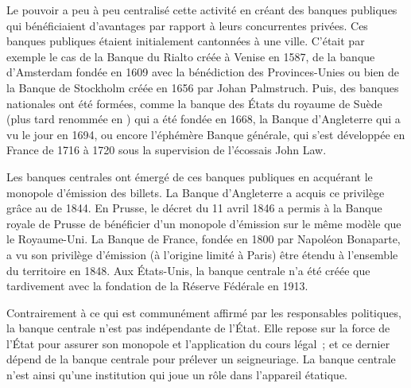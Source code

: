 Le pouvoir a peu à peu centralisé cette activité en créant des banques publiques qui bénéficiaient d'avantages par rapport à leurs concurrentes privées. Ces banques publiques étaient initialement cantonnées à une ville. C'était par exemple le cas de la Banque du Rialto créée à Venise en 1587, de la banque d'Amsterdam fondée en 1609 avec la bénédiction des Provinces-Unies ou bien de la Banque de Stockholm créée en 1656 par Johan Palmstruch. Puis, des banques nationales ont été formées, comme la banque des États du royaume de Suède (plus tard renommée en ) qui a été fondée en 1668, la Banque d'Angleterre qui a vu le jour en 1694, ou encore l'éphémère Banque générale, qui s'est développée en France de 1716 à 1720 sous la supervision de l'écossais John Law. %

Les banques centrales ont émergé de ces banques publiques en acquérant le monopole d'émission des billets. La Banque d'Angleterre a acquis ce privilège grâce au  de 1844. En Prusse, le décret du 11 avril 1846 a permis à la Banque royale de Prusse de bénéficier d'un monopole d'émission sur le même modèle que le Royaume-Uni. La Banque de France, fondée en 1800 par Napoléon Bonaparte, a vu son privilège d'émission (à l'origine limité à Paris) être étendu à l'ensemble du territoire en 1848. Aux États-Unis, la banque centrale n'a été créée que tardivement avec la fondation de la Réserve Fédérale en 1913.

Contrairement à ce qui est communément affirmé par les responsables politiques, la banque centrale n'est pas indépendante de l'État. Elle repose sur la force de l'État pour assurer son monopole et l'application du cours légal~; et ce dernier dépend de la banque centrale pour prélever un seigneuriage. La banque centrale n'est ainsi qu'une institution qui joue un rôle dans l'appareil étatique.

